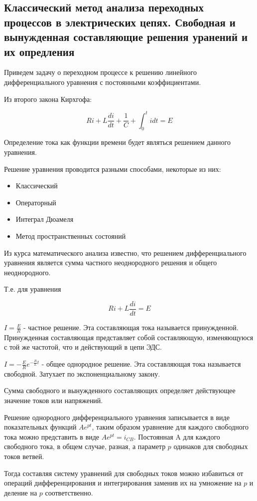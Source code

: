 \subsection{Классический метод анализа переходных процессов в электрических цепях. Свободная и вынужденная составляющие решения уранений и их опредления}

Приведем задачу о переходном процессе к решению линейного дифференциального уравнения с постоянными коэффициентами.

Из второго закона Кирхгофа:


\begin{equation}
R i + L \frac{di}{dt} + \frac{1}{C} + \int_0^t i dt = E
\end{equation}

Определение тока как функции времени будет являться решением данного уравнения.

Решение уравнения проводится разными способами, некоторые из них:

\begin{itemize}
\item
Классический
\item
Операторный
\item
Интеграл Дюамеля
\item
Метод пространственных состояний
\end{itemize}

Из курса математического анализа известно, что решением дифференциального уравнения является сумма частного неоднородного решения и общего неоднородного.

Т.е. для уравнения

\begin{equation}
R i + L \frac{di}{dt} = E
\end{equation}

$I = \frac{E}{R}$ - частное решение. Эта составляющая тока называется принужденной. Принужденная составляющая представляет собой составляющую, изменяющуюся с той же частотой, что и действующий в цепи ЭДС.

$I = -\frac{E}{R} e^{-\frac{R}{L}t}$ - общее однородное решение. Эта составляющая тока называется свободной. Затухает по экспоненциальному закону.

Сумма свободного и вынужденного составляющих определяет действующее значение токов или напряжений.

Решение однородного дифференциального уравнения записывается  в виде показательных функций $A e^{pt}$, таким образом уравнение для каждого свободного тока можно представить в виде $A e^{pt}=i_{CB}$. Постоянная A для каждого свободного тока, в общем случае, разная, а параметр $p$  одинаков для свободных токов ветвей.

Тогда составляя систему уравнений для свободных токов можно избавиться от операций дифференцирования и интегрирования заменив их на умножение на $p$ и деление на $p$ соответственно.






\pagebreak
